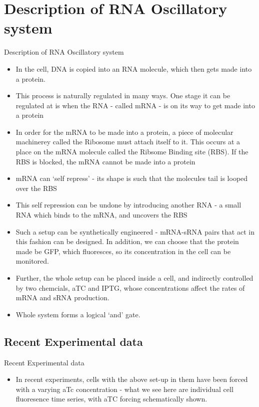 \documentclass[8pt]{beamer}
\begin{document}
\section{Description of RNA Oscillatory system}
\begin{frame}{Description of RNA Oscillatory system}
\begin{itemize}
\item In the cell, DNA is copied into an RNA molecule, which then gets made into a protein.
\item This process is naturally regulated in many ways. One stage it can be regulated at is when the RNA - called mRNA - is on its way to get made into a protein
\item In order for the mRNA to be made into a protein, a piece of molecular machinerey called the Ribosome must attach itself to it. This occurs at a place on the mRNA molecule called the Ribsome Binding site (RBS). If the RBS is blocked, the mRNA cannot be made into a protein
\item mRNA can `self repress' - its shape is such that the molecules tail is looped over the RBS
\item This self repression can be undone by introducing another RNA - a small RNA which binds to the mRNA, and uncovers the RBS
\item Such a setup can be synthetically engineered - mRNA-sRNA pairs that act in this fashion can be designed. In addition, we can choose that the protein made be GFP, which fluoresces, so its concentration in the cell can be monitored.

\item Further, the whole setup can be placed inside a cell, and indirectly controlled by two chemcials, aTC and IPTG, whose concentrations affect the rates of mRNA and sRNA production.
\item Whole system forms a logical `and' gate.
\end{itemize}
\end{frame}

\subsection{Recent Experimental data}

\begin{frame}{Recent Experimental data}{}
  \begin{itemize}
    \item  In recent experiments, cells with the above set-up in them have been forced with a varying aTc concentration - what we see here are individual cell fluoresence time series, with aTC forcing schematically shown. 
    \end{itemize}
\end{frame}
\end{document}
